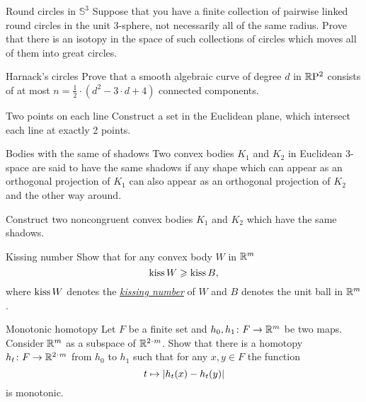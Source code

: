 \documentclass[twoside]{book}
\begin{document}
{%




\begin{pr}{\easy}{Round circles in $\mathbb{S}^3$}\label{Round circles}
Suppose that you have a finite collection of pairwise linked round circles in the unit 3-sphere, 
not necessarily all of the same radius. 
Prove that there is an isotopy in the space of such collections of circles 
which moves all of them into great circles.
\end{pr}

\begin{pr}{\thm}{Harnack's circles}\label{Harnack}
Prove that a smooth algebraic curve of degree $d$ in $\RP^2$ consists of at most $n=\tfrac12\cdot(d^2-3\cdot d+4)$ connected components.
\end{pr}

\begin{pr}{\thm}{Two points on each line}\label{2pts-on-line}
Construct a set in the Euclidean plane, which intersect each line at exactly 2 points. 
\end{pr}

\begin{pr}{\easy}{Bodies with the same of shadows}\label{Bodies with the same of shadows}
Two convex bodies $K_1$ and $K_2$ in Euclidean 3-space are said to have the same shadows if any shape which can appear as an orthogonal projection of $K_1$ can also appear as an orthogonal projection of $K_2$ and the other way around.

Construct two noncongruent convex bodies $K_1$ and $K_2$ which have the same shadows.
\end{pr}



\begin{pr}{\easy}{Kissing number}\label{pr:Kissing number}
Show that for any convex body $W$ in $\RR^m$
$$\mathop{\rm kiss}W\ge \mathop{\rm kiss}B,$$
where $\mathop{\rm kiss}W$ denotes the \hyperref[Kissing number]{\emph{kissing number}}
of $W$ and $B$ denotes the unit ball in $\RR^m$.
\end{pr}

\begin{pr}{}{Monotonic homotopy}\label{mono-homotopy} 
Let $F$ be a finite set and $h_0,h_1\: F\to\RR^m$ be two maps.
Consider $\RR^m$ as a subspace of $\RR^{2\cdot m}$.
Show that there is a homotopy  $h_t\:F\to\RR^{2\cdot m}$ from $h_0$ to $h_1$ such that for any $x,y\in F$ the function 
\[t\z\mapsto |h_t(x)-h_t(y)|\] 
is monotonic.
\end{pr}

}
\end{document}
